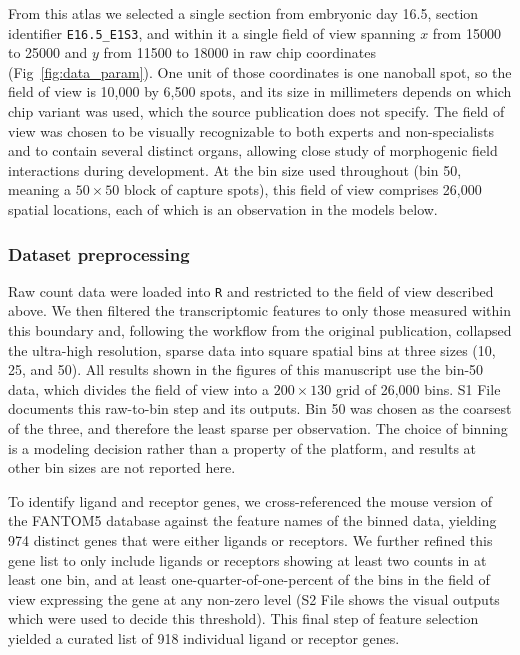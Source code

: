\documentclass[10pt,letterpaper]{article}
\begin{document}
From this atlas we selected a single section from embryonic day 16.5, section identifier \texttt{E16.5\_E1S3}, and within it a single field of view spanning $x$ from 15000 to 25000 and $y$ from 11500 to 18000 in raw chip coordinates (Fig~\ref{fig:data_param}). One unit of those coordinates is one nanoball spot, so the field of view is 10,000 by 6,500 spots, and its size in millimeters depends on which chip variant was used, which the source publication does not specify. The field of view was chosen to be visually recognizable to both experts and non-specialists and to contain several distinct organs, allowing close study of morphogenic field interactions during development. At the bin size used throughout (bin 50, meaning a $50\times50$ block of capture spots), this field of view comprises 26,000 spatial locations, each of which is an observation in the models below.

\subsubsection*{Dataset preprocessing}

Raw count data were loaded into \texttt{R} and restricted to the field of view described above. We then filtered the transcriptomic features to only those measured within this boundary and, following the workflow from the original publication, collapsed the ultra-high resolution, sparse data into square spatial bins at three sizes (10, 25, and 50). All results shown in the figures of this manuscript use the bin-50 data, which divides the field of view into a $200\times130$ grid of 26,000 bins. S1 File documents this raw-to-bin step and its outputs. Bin 50 was chosen as the coarsest of the three, and therefore the least sparse per observation. The choice of binning is a modeling decision rather than a property of the platform, and results at other bin sizes are not reported here.

To identify ligand and receptor genes, we cross-referenced the mouse version of the FANTOM5 database \cite{Ramilowski2015} against the feature names of the binned data, yielding 974 distinct genes that were either ligands or receptors. We further refined this gene list to only include ligands or receptors showing at least two counts in at least one bin, and at least one-quarter-of-one-percent of the bins in the field of view expressing the gene at any non-zero level (S2 File shows the visual outputs which were used to decide this threshold). This final step of feature selection yielded a curated list of 918 individual ligand or receptor genes.
\end{document}
